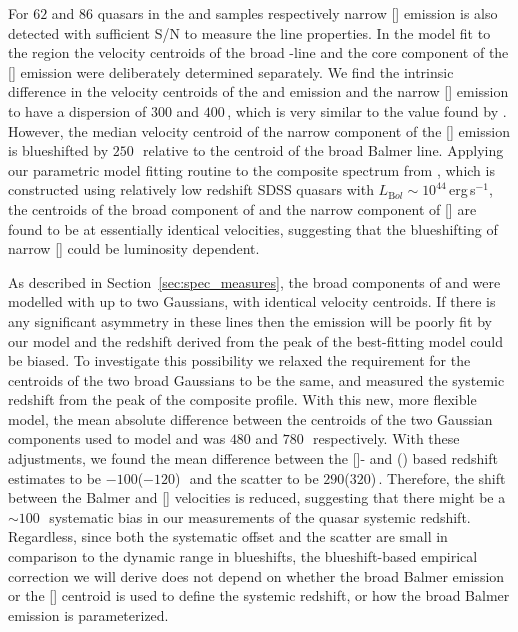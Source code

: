 For $62$ and $86$ quasars in the \ha and \hb samples respectively narrow [] emission is also detected with sufficient S/N to measure the line properties. 
In the model fit to the \hb region the velocity centroids of the broad \hbns-line and the core component of the [] emission were deliberately determined separately.
We find the intrinsic difference in the velocity centroids of the \ha and \hb emission and the narrow [] emission to have a dispersion of $300$ and $400$\,\kms, which is very similar to the value found by \citet{shen16b}. 
However, the median velocity centroid of the narrow component of the [] emission is blueshifted by $250$\,\kms\, relative to the centroid of the broad Balmer line. 
Applying our parametric model fitting routine to the composite spectrum from \citet{hewett10}, which is constructed using relatively low redshift SDSS quasars with $L_{\mathrm Bol}\sim10^{44}$\,erg\,s$^{-1}$, the centroids of the broad component of \hb and the narrow component of [] are found to be at essentially identical velocities, suggesting that the blueshifting of narrow [] could be luminosity dependent.

As described in Section~\ref{sec:spec_measures}, the broad components of \ha and \hb were modelled with up to two Gaussians, with identical velocity centroids. 
If there is any significant asymmetry in these lines then the emission will be poorly fit by our model and the 
redshift derived from the peak of the best-fitting model could be biased. 
To investigate this possibility we relaxed the requirement for the centroids of the two broad Gaussians to be the same, and measured the systemic redshift from the peak of the composite profile. 
With this new, more flexible model, the mean absolute difference between the centroids of the two Gaussian components used to model \ha and \hb was $480$ and $780$\,\kms\, respectively. 
With these adjustments, we found the mean difference between the []- and \hans(\hbns) based redshift estimates to be $-100$($-120$)\,\kms\, and the scatter to be $290$($320$)\,\kms. 
Therefore, the shift between the Balmer and [] velocities is reduced, suggesting that there might be a $\sim100$\,\kms\, systematic bias in our measurements of the quasar systemic redshift.  
Regardless, since both the systematic offset and the scatter are small in comparison to the dynamic range in  blueshifts, the blueshift-based empirical correction we will derive does not depend on whether the broad Balmer emission or the [] centroid is used to define the systemic redshift, or how the broad Balmer emission is parameterized. 

